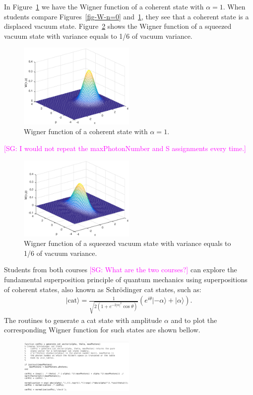 \documentclass[twocolumn]{rbef}
\providecommand{\aucmnt}[1]{#1}
\providecommand{\editcolor}[2]{\textcolor{#1}{#2}}
\providecommand{\aucmnt}[1]{}
\providecommand{\editcolor}[2]{#2}
\newcommand{\SGc}[1]{\aucmnt{\editcolor{magenta}{[SG: #1]}}}
\begin{document}
In Figure~\ref{fig-coherent-alpha=1} we have the Wigner function of a coherent state with $\alpha = 1$. When students compare Figures~\ref{fig-W-n=0} and~\ref{fig-coherent-alpha=1}, they see that a coherent state is a displaced vacuum state. Figure~\ref{fig-squeezed-state} shows the Wigner function of a squeezed vacuum state with variance equals to 1/6 of vacuum variance.

\begin{figure}[h]
\includegraphics[width=0.5\textwidth]{coherent-alpha=1.eps}
\caption{Wigner function of a coherent state with $\alpha=1$.}
\label{fig-coherent-alpha=1}
\end{figure}

\SGc{I would not repeat the maxPhotonNumber and S assignments every time.}

\begin{figure}[h]
\includegraphics[width=0.5\textwidth]{wigner-squeezed1.eps}
\caption{Wigner function of a squeezed vacuum state with variance equals to 1/6 of vacuum variance.}
\label{fig-squeezed-state}
\end{figure}

Students from both courses \SGc{What are the two courses?} can explore the fundamental superposition principle of quantum mechanics using superpositions of coherent states, also known as Schr\"odinger cat states, such as:
\begin{eqnarray}
|\mathrm{cat}\rangle = \frac{1}{\sqrt{2\left( 1+ e^{-2|\alpha|^2} \cos \theta \right)}} \left(e^{i \theta} |-\alpha\rangle + |\alpha\rangle \right).
\end{eqnarray}
The routines to generate a cat state with amplitude $\alpha$ and to plot the corresponding Wigner function for such states are shown bellow. 
\begin{figure}[h!]
\includegraphics[width=0.5\textwidth]{generate_cat_vector.eps}
\end{figure}
\end{document}
